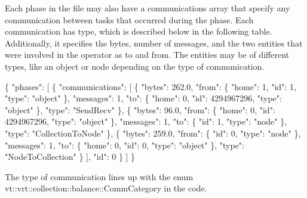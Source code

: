 Each phase in the file may also have a {\ttfamily communications} array that specify any communication between tasks that occurred during the phase. Each communication has {\ttfamily type}, which is described below in the following table. Additionally, it specifies the {\ttfamily bytes}, number of {\ttfamily messages}, and the two entities that were involved in the operator as {\ttfamily to} and {\ttfamily from}. The entities may be of different types, like an {\ttfamily object} or {\ttfamily node} depending on the type of communication.


\begin{DoxyCode}
\{
    "phases": [
        \{
            "communications": [
                \{
                    "bytes": 262.0,
                    "from": \{
                        "home": 1,
                        "id": 1,
                        "type": "object"
                    \},
                    "messages": 1,
                    "to": \{
                        "home": 0,
                        "id": 4294967296,
                        "type": "object"
                    \},
                    "type": "SendRecv"
                \},
                \{
                    "bytes": 96.0,
                    "from": \{
                        "home": 0,
                        "id": 4294967296,
                        "type": "object"
                    \},
                    "messages": 1,
                    "to": \{
                        "id": 1,
                        "type": "node"
                    \},
                    "type": "CollectionToNode"
                \},
                \{
                    "bytes": 259.0,
                    "from": \{
                        "id": 0,
                        "type": "node"
                    \},
                    "messages": 1,
                    "to": \{
                        "home": 0,
                        "id": 0,
                        "type": "object"
                    \},
                    "type": "NodeToCollection"
                \}
            ],
            "id": 0
        \}
    ]
\}
\end{DoxyCode}


The type of communication lines up with the enum {\ttfamily vt\+::vrt\+::collection\+::balance\+::\+Comm\+Category} in the code.

